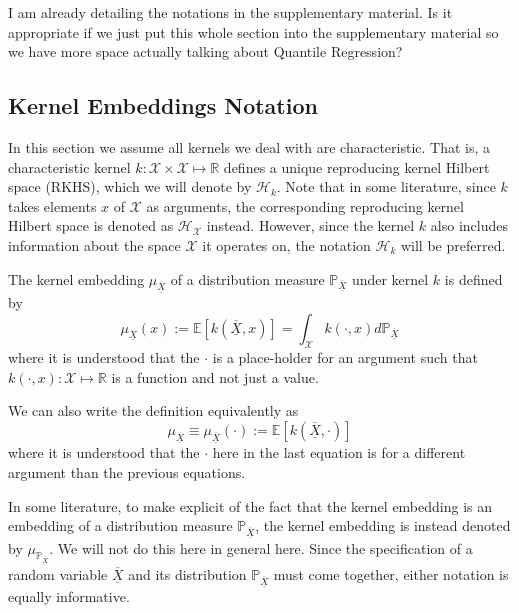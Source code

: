 \documentclass[twoside]{article} \usepackage{aistats2017}
\newcommand{\rv}[1]{\underline{\overline{#1}}}
\newcommand{\warn}[1]{{\color{red} #1}}
\begin{document}
		\warn{I am already detailing the notations in the supplementary material. Is it appropriate if we just put this whole section into the supplementary material so we have more space actually talking about Quantile Regression?}
		
	\subsection{Kernel Embeddings Notation}
	
		In this section we assume all kernels we deal with are characteristic. That is, a characteristic kernel $k : \mathcal{X} \times \mathcal{X} \mapsto \mathbb{R}$ defines a unique reproducing kernel Hilbert space (RKHS), which we will denote by $\mathcal{H}_{k}$. Note that in some literature, since $k$ takes elements $x$ of $\mathcal{X}$ as arguments, the corresponding reproducing kernel Hilbert space is denoted as $\mathcal{H}_{\mathcal{X}}$ instead. However, since the kernel $k$ also includes information about the space $\mathcal{X}$ it operates on, the notation $\mathcal{H}_{k}$ will be preferred.
		 
		The kernel embedding $\mu_{\rv{X}}$ of a distribution measure $\mathbb{P}_{\rv{X}}$ under kernel $k$ is defined by
		\begin{equation}
			\mu_{\rv{X}}(x) := \mathbb{E}[k(\rv{X}, x)] = \int_{\mathcal{X}} k(\cdot, x) d \mathbb{P}_{\rv{X}}
		\label{eq:basic_embedding}
		\end{equation}
		where it is understood that the $\cdot$ is a place-holder for an argument such that $k(\cdot, x) : \mathcal{X} \mapsto \mathbb{R}$ is a function and not just a value.
		
		We can also write the definition equivalently as
		\begin{equation}
			\mu_{\rv{X}} \equiv \mu_{\rv{X}}(\cdot) := \mathbb{E}[k(\rv{X}, \cdot)]
		\label{eq:basic_embedding_alternative}
		\end{equation}
		where it is understood that the $\cdot$ here in the last equation is for a different argument than the previous equations.
		 
		In some literature, to make explicit of the fact that the kernel embedding is an embedding of a distribution measure $\mathbb{P}_{\rv{X}}$, the kernel embedding is instead denoted by $\mu_{\mathbb{P}_{\rv{X}}}$. We will not do this here in general here. Since the specification of a random variable $\rv{X}$ and its distribution $\mathbb{P}_{\rv{X}}$ must come together, either notation is equally informative.
		 
\end{document}
